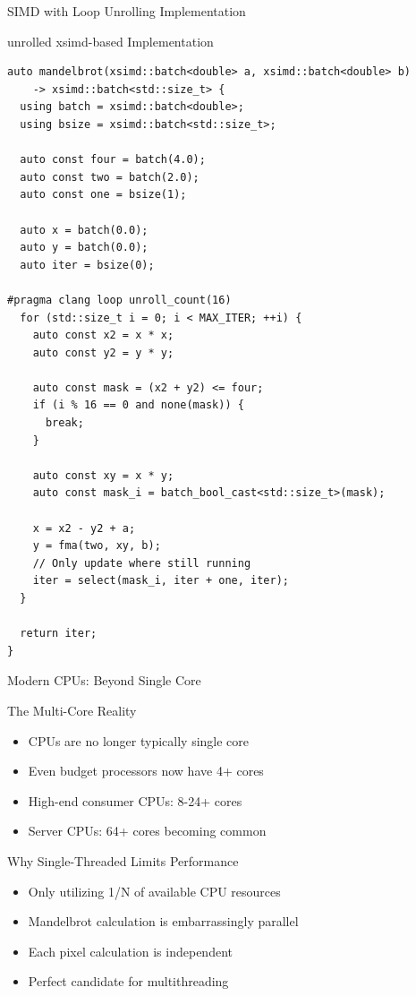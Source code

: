 \documentclass{beamer}
\begin{document}
\begin{frame}[fragile]{SIMD with Loop Unrolling Implementation}
    \begin{exampleblock}{unrolled xsimd-based Implementation}
        \begin{verbatim}
auto mandelbrot(xsimd::batch<double> a, xsimd::batch<double> b)
    -> xsimd::batch<std::size_t> {
  using batch = xsimd::batch<double>;
  using bsize = xsimd::batch<std::size_t>;

  auto const four = batch(4.0);
  auto const two = batch(2.0);
  auto const one = bsize(1);

  auto x = batch(0.0);
  auto y = batch(0.0);
  auto iter = bsize(0);

#pragma clang loop unroll_count(16)
  for (std::size_t i = 0; i < MAX_ITER; ++i) {
    auto const x2 = x * x;
    auto const y2 = y * y;

    auto const mask = (x2 + y2) <= four;
    if (i % 16 == 0 and none(mask)) {
      break;
    }

    auto const xy = x * y;
    auto const mask_i = batch_bool_cast<std::size_t>(mask);

    x = x2 - y2 + a;
    y = fma(two, xy, b);
    // Only update where still running
    iter = select(mask_i, iter + one, iter);
  }

  return iter;
}
        \end{verbatim}
    \end{exampleblock}
\end{frame}

\begin{frame}{Modern CPUs: Beyond Single Core}
    \begin{block}{The Multi-Core Reality}
        \begin{itemize}
            \item CPUs are no longer typically single core
            \item Even budget processors now have 4+ cores
            \item High-end consumer CPUs: 8-24+ cores
            \item Server CPUs: 64+ cores becoming common
        \end{itemize}
    \end{block}
    
    \begin{block}{Why Single-Threaded Limits Performance}
        \begin{itemize}
            \item Only utilizing 1/N of available CPU resources
            \item Mandelbrot calculation is embarrassingly parallel
            \item Each pixel calculation is independent
            \item Perfect candidate for multithreading
        \end{itemize}
    \end{block}
\end{frame}
\end{document}
